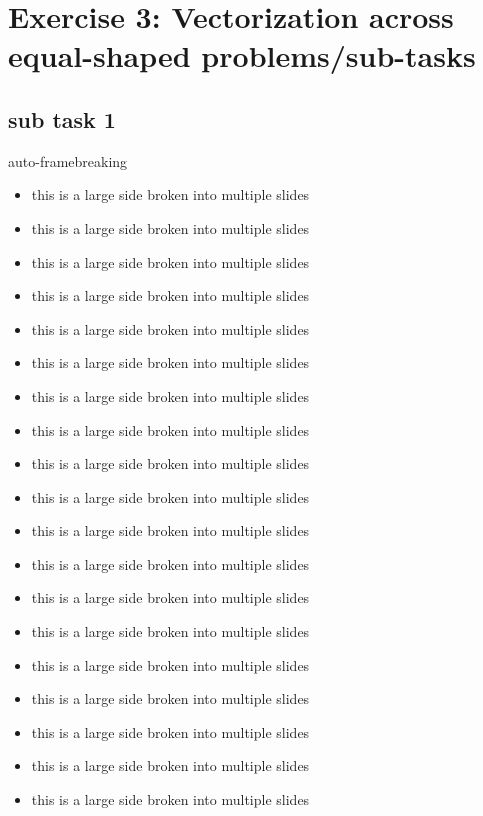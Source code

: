 \section{Exercise 3: Vectorization across equal-shaped problems/sub-tasks}
\subsection{sub task 1}
\begin{frame}[allowframebreaks]{auto-framebreaking}
\begin{itemize}
\item this is a large side broken into multiple slides
\item this is a large side broken into multiple slides
\item this is a large side broken into multiple slides
\item this is a large side broken into multiple slides
\item this is a large side broken into multiple slides
\item this is a large side broken into multiple slides
\item this is a large side broken into multiple slides
\item this is a large side broken into multiple slides
\item this is a large side broken into multiple slides
\item this is a large side broken into multiple slides
\item this is a large side broken into multiple slides
\item this is a large side broken into multiple slides
\item this is a large side broken into multiple slides
\item this is a large side broken into multiple slides
\item this is a large side broken into multiple slides
\item this is a large side broken into multiple slides
\item this is a large side broken into multiple slides
\item this is a large side broken into multiple slides
\item this is a large side broken into multiple slides
\end{itemize}
\end{frame}
